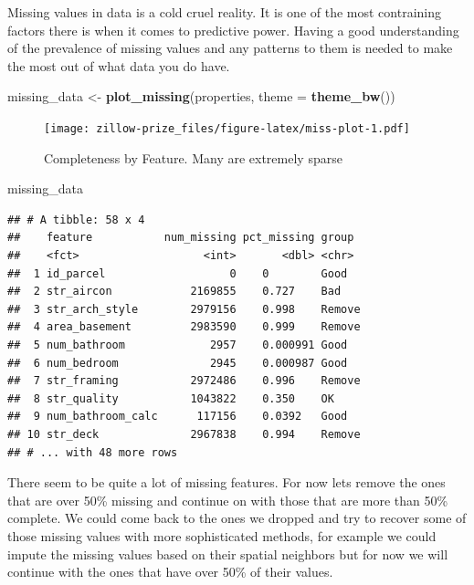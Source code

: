 \documentclass[]{book}
\newenvironment{Shaded}{\begin{snugshade}}{\end{snugshade}}
\newcommand{\KeywordTok}[1]{\textcolor[rgb]{0.13,0.29,0.53}{\textbf{#1}}}
\newcommand{\DataTypeTok}[1]{\textcolor[rgb]{0.13,0.29,0.53}{#1}}
\newcommand{\StringTok}[1]{\textcolor[rgb]{0.31,0.60,0.02}{#1}}
\newcommand{\NormalTok}[1]{#1}
\theoremstyle{definition}
\theoremstyle{definition}
\theoremstyle{definition}
\theoremstyle{remark}
\begin{document}
Missing values in data is a cold cruel reality. It is one of the most
contraining factors there is when it comes to predictive power. Having a
good understanding of the prevalence of missing values and any patterns
to them is needed to make the most out of what data you do have.

\begin{Shaded}
\begin{Highlighting}[]
\NormalTok{missing_data <-}\StringTok{ }\KeywordTok{plot_missing}\NormalTok{(properties, }\DataTypeTok{theme =} \KeywordTok{theme_bw}\NormalTok{())}
\end{Highlighting}
\end{Shaded}

\begin{figure}
\centering
\texttt{[image: zillow-prize\_files/figure-latex/miss-plot-1.pdf]}
\caption{\label{fig:miss-plot}Completeness by Feature. Many are extremely
sparse}
\end{figure}

\begin{Shaded}
\begin{Highlighting}[]
\NormalTok{missing_data}
\end{Highlighting}
\end{Shaded}

\begin{verbatim}
## # A tibble: 58 x 4
##    feature           num_missing pct_missing group 
##    <fct>                   <int>       <dbl> <chr> 
##  1 id_parcel                   0    0        Good  
##  2 str_aircon            2169855    0.727    Bad   
##  3 str_arch_style        2979156    0.998    Remove
##  4 area_basement         2983590    0.999    Remove
##  5 num_bathroom             2957    0.000991 Good  
##  6 num_bedroom              2945    0.000987 Good  
##  7 str_framing           2972486    0.996    Remove
##  8 str_quality           1043822    0.350    OK    
##  9 num_bathroom_calc      117156    0.0392   Good  
## 10 str_deck              2967838    0.994    Remove
## # ... with 48 more rows
\end{verbatim}

There seem to be quite a lot of missing features. For now lets remove
the ones that are over 50\% missing and continue on with those that are
more than 50\% complete. We could come back to the ones we dropped and
try to recover some of those missing values with more sophisticated
methods, for example we could impute the missing values based on their
spatial neighbors but for now we will continue with the ones that have
over 50\% of their values.
\end{document}
